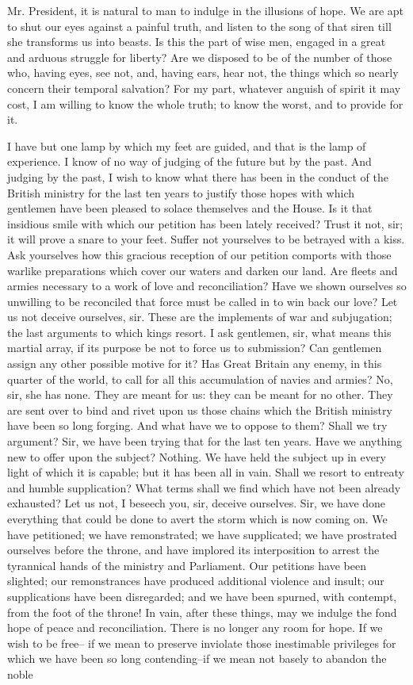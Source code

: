 \documentclass[a4paper]{amsbook}
\begin{document}
Mr. President, it is natural to man to indulge in the illusions of hope. We are apt to shut our eyes against a painful truth, and listen to the song of that siren till she transforms us into beasts. Is this the part of wise men, engaged in a great and arduous struggle for liberty? Are we disposed to be of the number of those who, having eyes, see not, and, having ears, hear not, the things which so nearly concern their temporal salvation? For my part, whatever anguish of spirit it may cost, I am willing to know the whole truth; to know the worst, and to provide for it.

I have but one lamp by which my feet are guided, and that is the lamp of experience. I know of no way of judging of the future but by the past. And judging by the past, I wish to know what there has been in the conduct of the British ministry for the last ten years to justify those hopes with which gentlemen have been pleased to solace themselves and the House. Is it that insidious smile with which our petition has been lately received? Trust it not, sir; it will prove a snare to your feet. Suffer not yourselves to be betrayed with a kiss. Ask yourselves how this gracious reception of our petition comports with those warlike preparations which cover our waters and darken our land. Are fleets and armies necessary to a work of love and reconciliation? Have we shown ourselves so unwilling to be reconciled that force must be called in to win back our love? Let us not deceive ourselves, sir. These are the implements of war and subjugation; the last arguments to which kings resort. I ask gentlemen, sir, what means this martial array, if its purpose be not to force us to submission? Can gentlemen assign any other possible motive for it? Has Great Britain any enemy, in this quarter of the world, to call for all this accumulation of navies and armies? No, sir, she has none. They are meant for us: they can be meant for no other. They are sent over to bind and rivet upon us those chains which the British ministry have been so long forging. And what have we to oppose to them? Shall we try argument? Sir, we have been trying that for the last ten years. Have we anything new to offer upon the subject? Nothing. We have held the subject up in every light of which it is capable; but it has been all in vain. Shall we resort to entreaty and humble supplication? What terms shall we find which have not been already exhausted? Let us not, I beseech you, sir, deceive ourselves. Sir, we have done everything that could be done to avert the storm which is now coming on. We have petitioned; we have remonstrated; we have supplicated; we have prostrated ourselves before the throne, and have implored its interposition to arrest the tyrannical hands of the ministry and Parliament. Our petitions have been slighted; our remonstrances have produced additional violence and insult; our supplications have been disregarded; and we have been spurned, with contempt, from the foot of the throne! In vain, after these things, may we indulge the fond hope of peace and reconciliation. There is no longer any room for hope. If we wish to be free– if we mean to preserve inviolate those inestimable privileges for which we have been so long contending–if we mean not basely to abandon the noble 
\end{document}
